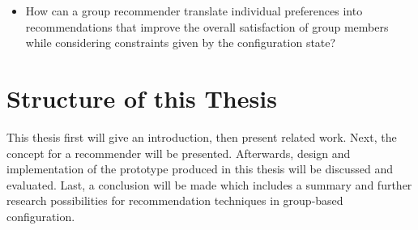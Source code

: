 \begin{itemize}
    \item How can a group recommender translate individual preferences into recommendations that improve the overall satisfaction of group members while considering constraints given by the configuration state? 
\end{itemize}


\section{Structure of this Thesis}
\label{sec:Introduction:Structure}

This thesis first will give an introduction, then present related work. Next, the concept for a recommender will be presented. Afterwards, design and implementation of the prototype produced in this thesis will be discussed and evaluated. Last, a conclusion will be made which includes a summary and further research possibilities for recommendation techniques in group-based configuration.
